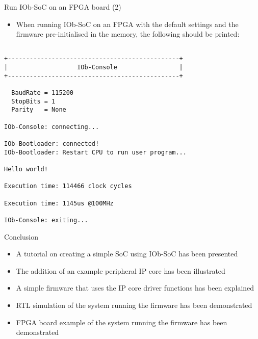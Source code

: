 \documentclass [xcolor=svgnames, t] {beamer}
\begin{document}
\begin{frame}[fragile]{Run IOb-SoC on an FPGA board (2)}
\begin{itemize}
\item When running IOb-SoC on an FPGA with the default settings and the firmware
  pre-initialised in the memory, the following should be printed:
\end{itemize}

\begin{tiny}
  \begin{lstlisting}

+-----------------------------------------------+
|                   IOb-Console                 |
+-----------------------------------------------+

  BaudRate = 115200
  StopBits = 1
  Parity   = None

IOb-Console: connecting...

IOb-Bootloader: connected!
IOb-Bootloader: Restart CPU to run user program...

Hello world!

Execution time: 114466 clock cycles

Execution time: 1145us @100MHz

IOb-Console: exiting...

  \end{lstlisting}
\end{tiny}
\end{frame}

\begin{frame}{Conclusion}
  \begin{itemize}
  \item A tutorial on creating a simple SoC using IOb-SoC has been presented
  \item The addition of an example peripheral IP core has been illustrated
  \item A simple firmware that uses the IP core driver functions has been explained
  \item RTL simulation of the system running the firmware has been demonstrated
  \item FPGA board example of the system running the firmware has been demonstrated
  \end{itemize}
\end{frame}

\end{document}
